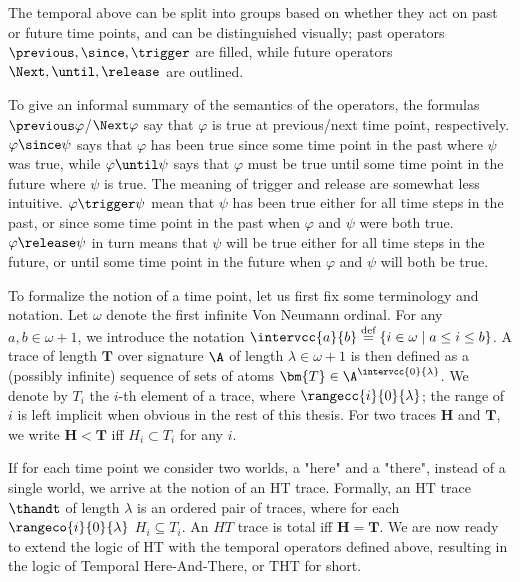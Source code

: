 The temporal above can be split into groups based on whether they act
on past or future time points, and can be distinguished visually; past
operators $\previous, \since, \trigger$ are filled, while future
operators $\Next, \until, \release$ are outlined.

To give an informal summary of the semantics of the operators, the
formulas $\previous \varphi$/$\Next \varphi$ say that $\varphi$ is
true at previous/next time point, respectively.  $\varphi \since \psi$
says that $\varphi$ has been true since some time point in the past
where $\psi$ was true, while $\varphi \until \psi$ says that $\varphi$
must be true until some time point in the future where $\psi$ is true.
The meaning of trigger and release are somewhat less
intuitive. $\varphi \trigger \psi$ mean that $\psi$ has been true
either for all time steps in the past, or since some time point in the
past when $\varphi$ and $\psi$ were both true. $\varphi \release \psi$
in turn means that $\psi$ will be true either for all time steps in
the future, or until some time point in the future when $\varphi$ and
$\psi$ will both be true.

To formalize the notion of a time point, let us first fix some
terminology and notation. Let $\omega$ denote the first infinite Von
Neumann ordinal. For any $a,b \in \omega + 1$, we introduce the
notation
$\intervcc{a}{b} \defeq \{ i \in \omega \mid a \leq i \leq b \}$. A
trace of length $\bm{T}$ over signature $\A$ of length
$\lambda \in \omega + 1$ is then defined as a (possibly infinite)
sequence of sets of atoms $\bm{T} \in \A^{\intervcc{0}{\lambda}}$. We
denote by $T_i$ the $i$-th element of a trace, where
$\rangecc{i}{0}{\lambda}$; the range of $i$ is left implicit when
obvious in the rest of this thesis. For two traces $\bm{H}$ and
$\bm{T}$, we write $\bm{H < T}$ iff $H_i \subset T_i$ for any $i$.

If for each time point we consider two worlds, a "here" and a "there",
instead of a single world, we arrive at the notion of an HT
trace. Formally, an HT trace $\thandt$ of length $\lambda$ is an
ordered pair of traces, where for each $\rangeco{i}{0}{\lambda}$
$H_i \subseteq T_i$. An $HT$ trace is total iff $\bm{H} = \bm{T}$. We
are now ready to extend the logic of HT with the temporal operators
defined above, resulting in the logic of Temporal Here-And-There, or
THT for short.

